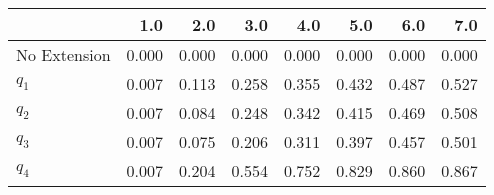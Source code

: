 \begin{tabular}{lrrrrrrr}
\toprule
{} &   1.0 &   2.0 &   3.0 &   4.0 &   5.0 &   6.0 &   7.0 \\
\midrule
No Extension & 0.000 & 0.000 & 0.000 & 0.000 & 0.000 & 0.000 & 0.000 \\
$q_1$        & 0.007 & 0.113 & 0.258 & 0.355 & 0.432 & 0.487 & 0.527 \\
$q_2$        & 0.007 & 0.084 & 0.248 & 0.342 & 0.415 & 0.469 & 0.508 \\
$q_3$        & 0.007 & 0.075 & 0.206 & 0.311 & 0.397 & 0.457 & 0.501 \\
$q_4$        & 0.007 & 0.204 & 0.554 & 0.752 & 0.829 & 0.860 & 0.867 \\
\bottomrule
\end{tabular}
